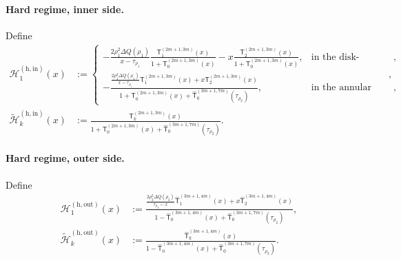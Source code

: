 \documentclass[a4paper]{article}
\numberwithin{equation}{section}
\begin{document}
\paragraph{Hard regime, inner side.}
Define
\begin{align}
\mathcal{H}_{1}^{(\mathrm{h,in})}(x)
&:=
\begin{cases}
-\frac{2\rho_1^2\Delta Q(\rho_1)}{x-\tau_{\rho_1}}
\frac{\mathsf{T}_{1}^{(2m+1,3m)}(x)}{1+\mathsf{T}_{0}^{(2m+1,3m)}(x)}
-
x\frac{\mathsf{T}_{2}^{(2m+1,3m)}(x)}{1+\mathsf{T}_{0}^{(2m+1,3m)}(x)}, & \text{in the disk-complement geometry}, \\
-\frac{\frac{2\rho_1^2\Delta Q(\rho_1)}{x-\tau_{\rho_1}}
\mathsf{T}_{1}^{(2m+1,3m)}(x)
+
x
\mathsf{T}_{2}^{(2m+1,3m)}(x)
}{
1+\mathsf{T}_{0}^{(2m+1,3m)}(x)+\widehat{\mathsf{T}}_0^{(3m+1,7m)}(\tau_{\rho_2})}, & \text{in the annular geometry},
\end{cases},
\\
\widetilde{\mathcal{H}}_{k}^{(\mathrm{h,in})}(x)&:=\frac{\mathsf{T}_{k}^{(2m+1,3m)}(x)}{1+\mathsf{T}_{0}^{(2m+1,3m)}(x)+\widehat{\mathsf{T}}_{0}^{(3m+1,7m)}(\tau_{\rho_2})}.
\end{align}
\paragraph{Hard regime, outer side.}
Define
\begin{align}
\mathcal{H}_1^{(\mathrm{h,out})}(x)&:=
\frac{\frac{2\rho_2^2\Delta Q(\rho_2)}{\tau_{\rho_2}-x}
\widehat{\mathsf{T}}_{1}^{(3m+1,4m)}(x)
+x\widehat{\mathsf{T}}_{2}^{(3m+1,4m)}(x)}{1-\widehat{\mathsf{T}}_0^{(3m+1,4m)}(x)+\widehat{\mathsf{T}}_0^{(3m+1,7m)}(\tau_{\rho_2})}, 
\\
\widetilde{\mathcal{H}}_{k}^{(\mathrm{h,out})}(x)&:=\frac{\widehat{\mathsf{T}}_{k}^{(3m+1,4m)}(x)}{1-\widehat{\mathsf{T}}_0^{(3m+1,4m)}(x)+\widehat{\mathsf{T}}_0^{(3m+1,7m)}(\tau_{\rho_2})}.
\end{align}
\end{document}
